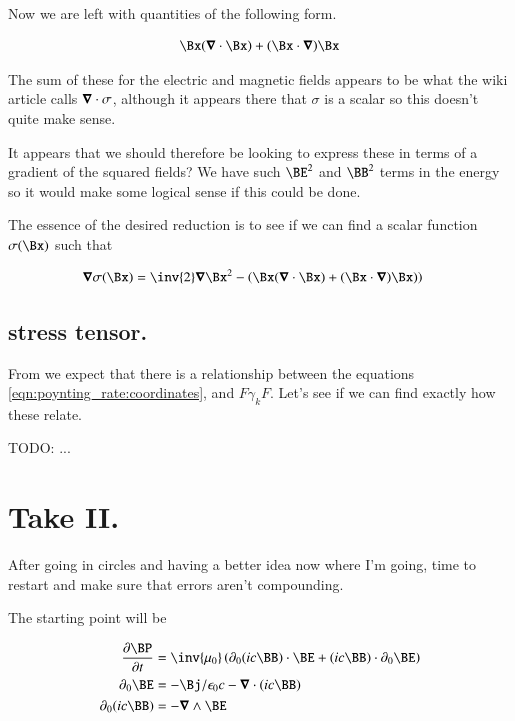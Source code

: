 Now we are left with quantities of the following form.

\begin{align*}
\Bx (\spacegrad \cdot \Bx) +(\Bx \cdot \spacegrad) \Bx 
\end{align*}

The sum of these for the electric and magnetic fields appears to be what the 
wiki article calls $\boldsymbol{\nabla} \cdot \sigma$, although it appears
there that $\sigma$ is a scalar so this doesn't quite make sense.

It appears that 
we should therefore be looking to
express these in terms of a gradient of the squared fields?  We have such $\BE^2$ and $\BB^2$ terms in the energy so it would make some logical sense if this
could be done.

The essence of the desired reduction is to see if we can find a scalar function $\sigma(\Bx)$ such that

\begin{align*}
\spacegrad \sigma(\Bx) &= \inv{2} \spacegrad \Bx^2 - \left(\Bx (\spacegrad \cdot \Bx) + (\Bx \cdot \spacegrad) \Bx )\right)
\end{align*}

\subsection{stress tensor. }

From \cite{doran2003gap} we expect that there is a relationship between
the equations \ref{eqn:poynting_rate:coordinates}, and $F \gamma_k F$.  Let's see 
if we can find exactly how these relate.



TODO: ...

\section{Take II. }

After going in circles and having a better idea now where I'm going, time to restart and make sure that errors aren't compounding.

The starting point will be

\begin{align*}
\PD{t}{\BP} &= \inv{\mu_0} \left( \partial_0 (i c\BB) \cdot \BE  + (i c\BB) \cdot \partial_0 \BE  \right) \\
\partial_0 \BE &= - \Bj/\epsilon_0 c - \spacegrad \cdot (ic \BB) \\
\partial_0 (i c \BB) &= -\spacegrad \wedge \BE
\end{align*}

